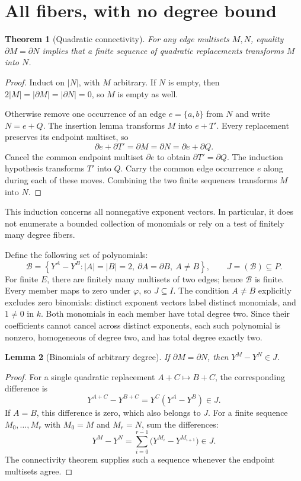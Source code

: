 \documentclass[11pt,letterpaper]{article}
\newtheorem{theorem}{Theorem}
\newtheorem{lemma}[theorem]{Lemma}
\newcommand{\xM}[1]{Y^{#1}}
\newcommand{\dd}{\partial}
\newcommand{\ee}[2]{\{#1,#2\}}
\begin{document}
\newpage
\section{All fibers, with no degree bound}
\begin{theorem}[Quadratic connectivity]
For any edge multisets $M,N$, equality $\dd M=\dd N$ implies that a finite
sequence of quadratic replacements transforms $M$ into $N$.
\end{theorem}
\begin{proof}
Induct on $|N|$, with $M$ arbitrary. If $N$ is empty, then
$2|M|=|\dd M|=|\dd N|=0$, so $M$ is empty as well.

Otherwise remove one occurrence of an edge $e=\ee{a}{b}$ from $N$ and
write $N=e+Q$. The insertion lemma transforms $M$ into $e+T'$.
Every replacement preserves its endpoint multiset, so
\[
 \dd e+\dd T'=\dd M=\dd N=\dd e+\dd Q.
\]
Cancel the common endpoint multiset $\dd e$ to obtain
$\dd T'=\dd Q$. The induction hypothesis transforms $T'$ into $Q$.
Carry the common edge occurrence $e$ along during each of these moves.
Combining the two finite sequences transforms $M$ into $N$.
\end{proof}

This induction concerns all nonnegative exponent vectors. In particular,
it does not enumerate a bounded collection of monomials or rely on a
test of finitely many degree fibers.

Define the following set of polynomials:
\[
 \mathcal B=\left\{\xM{A}-\xM{B}:
 |A|=|B|=2,\ \dd A=\dd B,\ A\ne B\right\},
 \qquad J=(\mathcal B)\subseteq P.
\]
For finite $E$, there are finitely many multisets of two edges; hence
$\mathcal B$ is finite. Every member maps to zero under $\varphi$, so
$J\subseteq I$. The condition $A\ne B$ explicitly excludes zero binomials:
distinct exponent vectors label distinct monomials, and $1\ne0$ in $k$.
Both monomials in each member have total degree two. Since their
coefficients cannot cancel across distinct exponents, each such polynomial
is nonzero, homogeneous of degree two, and has total degree exactly two.

\begin{lemma}[Binomials of arbitrary degree]
If $\dd M=\dd N$, then $\xM{M}-\xM{N}\in J$.
\end{lemma}
\begin{proof}
For a single quadratic replacement $A+C\mapsto B+C$, the corresponding
difference is
\[
 \xM{A+C}-\xM{B+C}=\xM{C}(\xM{A}-\xM{B})\in J.
\]
If $A=B$, this difference is zero, which also belongs to $J$.
For a finite sequence $M_0,\ldots,M_r$ with $M_0=M$ and $M_r=N$, sum
the differences:
\[
 \xM{M}-\xM{N}
   =\sum_{i=0}^{r-1}\bigl(\xM{M_i}-\xM{M_{i+1}}\bigr)\in J.
\]
The connectivity theorem supplies such a sequence whenever the endpoint
multisets agree.
\end{proof}
\end{document}
